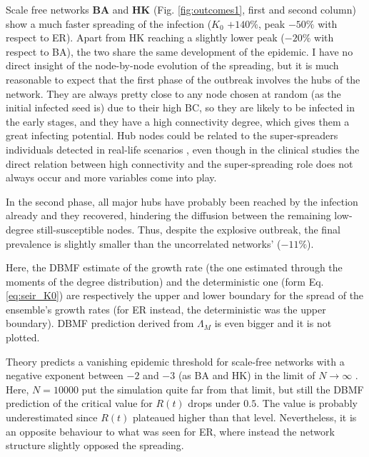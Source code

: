 \documentclass[DIV=12, BCOR=0pt]{scrartcl}  %
\begin{document}
  Scale free networks \textbf{BA} and \textbf{HK} (Fig. \ref{fig:outcomes1}, first and second column) show a much faster spreading of the infection ($K_0$ $+ 140 \%$, peak $- 50 \%$ with respect to ER). Apart from HK reaching a slightly lower peak ($- 20 \%$ with respect to BA), the two share the same development of the epidemic.
  I have no direct insight of the node-by-node evolution of the spreading, but it is much reasonable to expect that the first phase of the outbreak involves the hubs of the network. They are always pretty close to any node chosen at random (as the initial infected seed is) due to their high BC, so they are likely to be infected in the early stages, and they have a high connectivity degree, which gives them a great infecting potential. Hub nodes could be related to the super-spreaders individuals detected in real-life scenarios \citep{Kissler2018}, even though in the clinical studies the direct relation between high connectivity and the super-spreading role does not always occur and more variables come into play. %
  
  In the second phase, all major hubs have probably been reached by the infection already and they recovered, hindering the diffusion between the remaining low-degree still-susceptible nodes. Thus, despite the explosive outbreak, the final prevalence is slightly smaller than the uncorrelated networks' ($- 11 \%$).
  
  Here, the DBMF estimate of the growth rate (the one estimated through the moments of the degree distribution) and the deterministic one (form Eq. \ref{eq:seir_K0}) are respectively the upper and lower boundary for the spread of the ensemble's growth rates (for ER instead, the deterministic was the upper boundary). DBMF prediction derived from $\Lambda_M$ is even bigger and it is not plotted. 
  
  Theory predicts a vanishing epidemic threshold for scale-free networks with a negative exponent between $-2$ and $-3$ (as BA and HK) in the limit of $N \rightarrow \infty$ \citep{PastorSatorras}. Here, $N=10000$ put the simulation quite far from that limit, but still the DBMF prediction of the critical value for $R(t)$ drops under $0.5$. The value is probably underestimated since $R(t)$ plateaued higher than that level. Nevertheless, it is an opposite behaviour to what was seen for ER, where instead the network structure slightly opposed the spreading.
  
\end{document}
